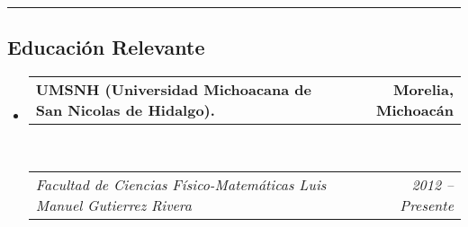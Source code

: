 \documentclass[10pt,letterpaper]{article}
\makeatletter
\newcommand{\headerrow}[2]
{\begin{tabular*}{\linewidth}{l@{\extracolsep{\fill}}r}
	#1 &
	#2 \\
\end{tabular*}}
\makeatother
\begin{document}
\hrule
\vspace{-0.4em}
\subsection*{Educación Relevante}

\begin{itemize}
	\parskip=0.1em

	\item 
	\headerrow
		{\textbf{UMSNH (Universidad Michoacana de San Nicolas de Hidalgo).}}
		{\textbf{Morelia, Michoacán}}
	\\
	\headerrow
		{\emph{Facultad de Ciencias Físico-Matemáticas Luis Manuel Gutierrez Rivera}}
		{\emph{2012 -- Presente}}

\end{itemize}
\end{document}
